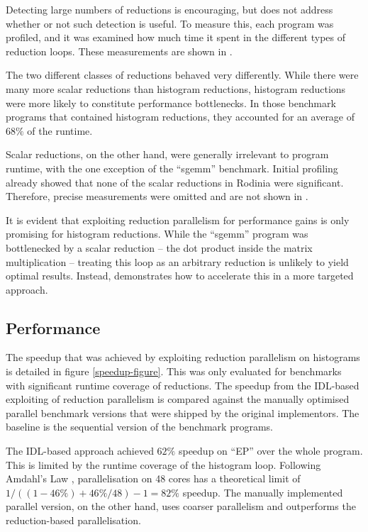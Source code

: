     Detecting large numbers of reductions is encouraging, but does not address
    whether or not such detection is useful.
    To measure this, each program was profiled, and it was examined how much
    time it spent in the different types of reduction loops.
    These measurements are shown in
    .

    The two different classes of reductions behaved very differently.
    While there were many more scalar reductions than histogram reductions,
    histogram reductions were  more likely to constitute performance
    bottlenecks.
    In those benchmark programs that contained histogram reductions,
    they accounted for an average of $68\%$ of the runtime.

    Scalar reductions, on the other hand, were generally irrelevant to program
    runtime, with the one exception of the ``sgemm'' benchmark.
    Initial profiling already showed that none of the scalar reductions in
    Rodinia were significant.
    Therefore, precise measurements were omitted and are not shown in
    .

    It is evident that exploiting reduction parallelism for performance gains
    is only promising for histogram reductions.
    While the ``sgemm'' program was bottlenecked by a scalar reduction -- the
    dot product inside the matrix multiplication -- treating this loop as an
    arbitrary reduction is unlikely to yield optimal results.
    Instead,  demonstrates how to accelerate this in a more
    targeted approach.

\subsection{Performance}

    The speedup that was achieved by exploiting reduction parallelism on
    histograms is detailed in figure \ref{speedup-figure}.
    This was only evaluated for benchmarks with significant runtime coverage of
    reductions.
    The speedup from the IDL-based exploiting of reduction parallelism
    is compared against the manually optimised parallel benchmark versions that
    were shipped by the original implementors.
    The baseline is the sequential version of the benchmark programs.

    The IDL-based approach achieved $62\%$ speedup on ``EP'' over the whole
    program.
    This is limited by the runtime coverage of the histogram loop.
    Following Amdahl's Law
    \citep{Amdahl:1967:VSP:1465482.1465560,Hill:2008:ALM:1449375.1449387},
    parallelisation on 48 cores has a theoretical limit of
    $1/((1-46\%)+46\%/48)-1=82\%$ speedup.
    The manually implemented parallel version, on the other hand, uses coarser
    parallelism and outperforms the reduction-based parallelisation.

